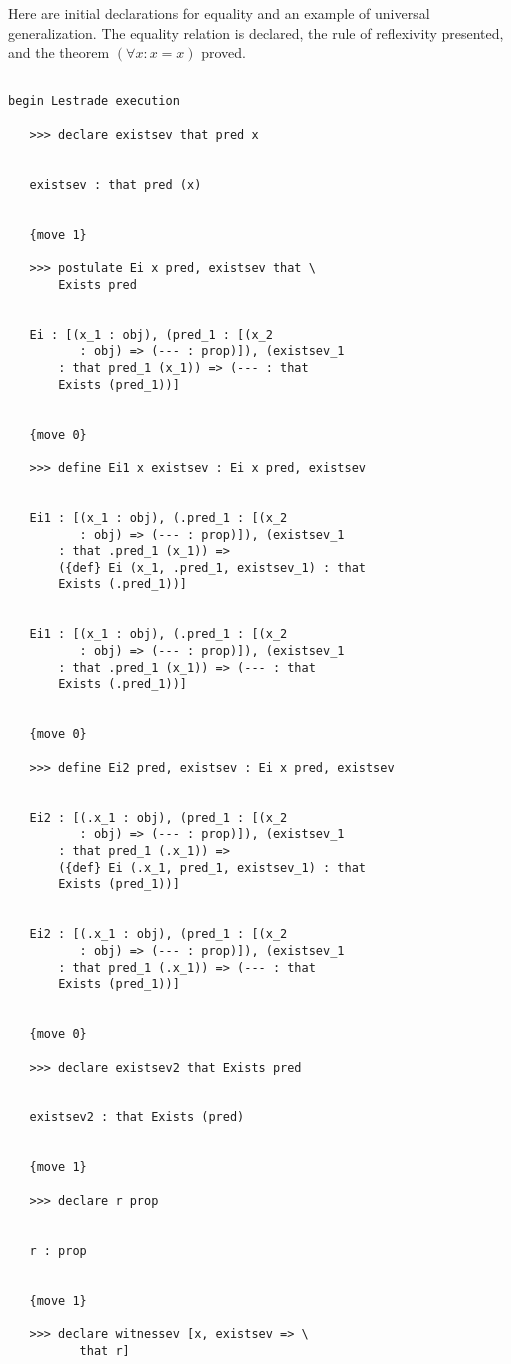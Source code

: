 \documentclass[12pt]{article}
\begin{document}
Here are initial declarations for equality and an example of universal generalization.  The equality relation is declared, the rule of reflexivity presented, 
and the theorem $(\forall x:x=x)$ proved.

\begin{verbatim}

begin Lestrade execution

   >>> declare existsev that pred x


   existsev : that pred (x)


   {move 1}

   >>> postulate Ei x pred, existsev that \
       Exists pred


   Ei : [(x_1 : obj), (pred_1 : [(x_2 
          : obj) => (--- : prop)]), (existsev_1 
       : that pred_1 (x_1)) => (--- : that 
       Exists (pred_1))]


   {move 0}

   >>> define Ei1 x existsev : Ei x pred, existsev


   Ei1 : [(x_1 : obj), (.pred_1 : [(x_2 
          : obj) => (--- : prop)]), (existsev_1 
       : that .pred_1 (x_1)) => 
       ({def} Ei (x_1, .pred_1, existsev_1) : that 
       Exists (.pred_1))]


   Ei1 : [(x_1 : obj), (.pred_1 : [(x_2 
          : obj) => (--- : prop)]), (existsev_1 
       : that .pred_1 (x_1)) => (--- : that 
       Exists (.pred_1))]


   {move 0}

   >>> define Ei2 pred, existsev : Ei x pred, existsev


   Ei2 : [(.x_1 : obj), (pred_1 : [(x_2 
          : obj) => (--- : prop)]), (existsev_1 
       : that pred_1 (.x_1)) => 
       ({def} Ei (.x_1, pred_1, existsev_1) : that 
       Exists (pred_1))]


   Ei2 : [(.x_1 : obj), (pred_1 : [(x_2 
          : obj) => (--- : prop)]), (existsev_1 
       : that pred_1 (.x_1)) => (--- : that 
       Exists (pred_1))]


   {move 0}

   >>> declare existsev2 that Exists pred


   existsev2 : that Exists (pred)


   {move 1}

   >>> declare r prop


   r : prop


   {move 1}

   >>> declare witnessev [x, existsev => \
          that r]



\end{verbatim}
\end{document}
